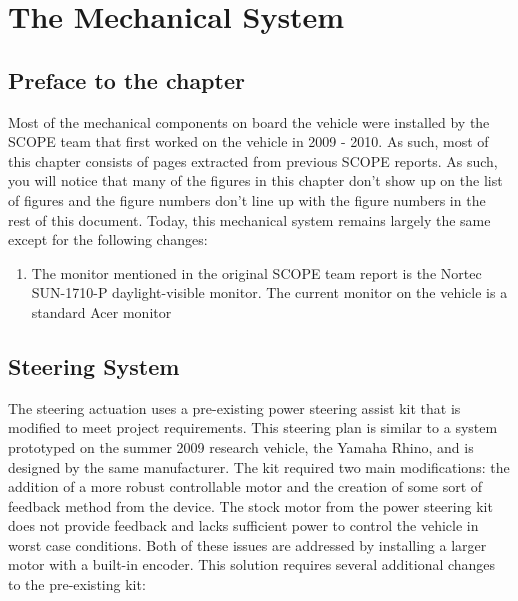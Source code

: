 \chapter{The Mechanical System}

\section{Preface to the chapter}
Most of the mechanical components on board the vehicle were installed by the SCOPE team that first worked on the vehicle in 2009 - 2010. As such, most of this chapter consists of pages extracted from previous SCOPE reports. As such, you will notice that many of the figures in this chapter don't show up on the list of figures and the figure numbers don't line up with the figure numbers in the rest of this document. 
%
Today, this mechanical system remains largely the same except for the following changes:

\begin{enumerate}
\item The monitor mentioned in the original SCOPE team report is the Nortec SUN-1710-P daylight-visible monitor. The current monitor on the vehicle is a standard Acer monitor
\end{enumerate}

\newpage







\newpage

\section{Steering System}
The steering actuation uses a pre-existing power steering assist kit that is modified to meet project requirements. This steering plan is similar to a system prototyped on the summer 2009 research vehicle, the Yamaha Rhino, and is designed by the same manufacturer. The kit required two main modifications: the addition of a more robust controllable motor and the creation of some sort of feedback method from the device. The stock motor from the power steering kit does not provide feedback and lacks sufficient power to control the vehicle in worst case conditions. Both of these issues are addressed by installing a larger motor with a built-in encoder. This solution requires several additional changes to the pre-existing kit: 

